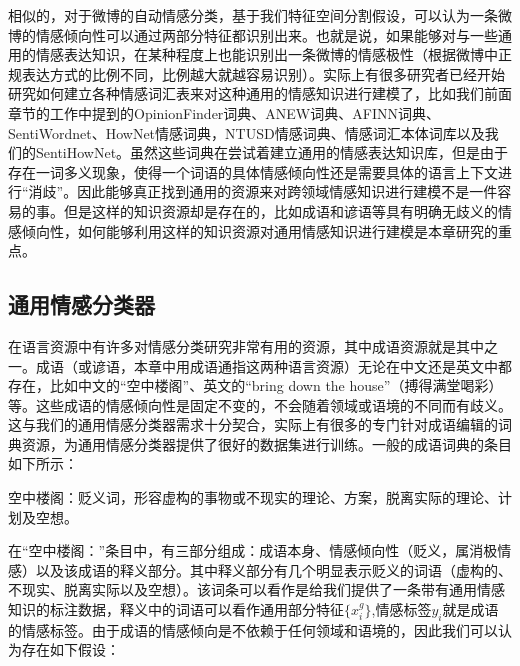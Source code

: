 相似的，对于微博的自动情感分类，基于我们特征空间分割假设，可以认为一条微博的情感倾向性可以通过两部分特征都识别出来。也就是说，如果能够对与一些通用的情感表达知识，在某种程度上也能识别出一条微博的情感极性（根据微博中正规表达方式的比例不同，比例越大就越容易识别）。实际上有很多研究者已经开始研究如何建立各种情感词汇表来对这种通用的情感知识进行建模了，比如我们前面章节的工作中提到的OpinionFinder词典、ANEW词典、AFINN词典、SentiWordnet、HowNet情感词典，NTUSD情感词典、情感词汇本体词库以及我们的SentiHowNet。虽然这些词典在尝试着建立通用的情感表达知识库，但是由于存在一词多义现象，使得一个词语的具体情感倾向性还是需要具体的语言上下文进行“消歧”。因此能够真正找到通用的资源来对跨领域情感知识进行建模不是一件容易的事。但是这样的知识资源却是存在的，比如成语和谚语等具有明确无歧义的情感倾向性，如何能够利用这样的知识资源对通用情感知识进行建模是本章研究的重点。

\subsection{通用情感分类器}
\label{general}
在语言资源中有许多对情感分类研究非常有用的资源，其中成语资源就是其中之一。成语（或谚语，本章中用成语通指这两种语言资源）无论在中文还是英文中都存在，比如中文的“空中楼阁”、英文的``bring down the house''（搏得满堂喝彩）等。这些成语的情感倾向性是固定不变的，不会随着领域或语境的不同而有歧义。这与我们的通用情感分类器需求十分契合，实际上有很多的专门针对成语编辑的词典资源，为通用情感分类器提供了很好的数据集进行训练。一般的成语词典的条目如下所示：
\begin{description}
\item{空中楼阁：}贬义词，形容虚构的事物或不现实的理论、方案，脱离实际的理论、计划及空想。
\end{description}
在“空中楼阁：”条目中，有三部分组成：成语本身、情感倾向性（贬义，属消极情感）以及该成语的释义部分。其中释义部分有几个明显表示贬义的词语（虚构的、不现实、脱离实际以及空想）。该词条可以看作是给我们提供了一条带有通用情感知识的标注数据，释义中的词语可以看作通用部分特征$\{x_i^g\}$,情感标签$y_i$就是成语的情感标签。由于成语的情感倾向是不依赖于任何领域和语境的，因此我们可以认为存在如下假设：


